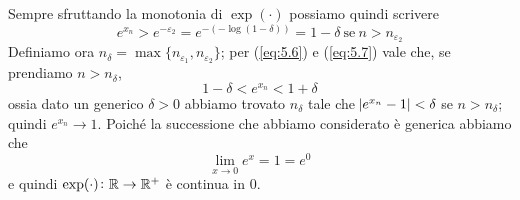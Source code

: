 \begin{example}
\[    \]
    Sempre sfruttando la monotonia di $\exp(\cdot)$ possiamo quindi scrivere
    \begin{equation}
        \label{eq:5.7}
        e^{x_n}>e^{-\varepsilon_2} = e^{-(-\log(1-\delta))} = 1-\delta \ \text{se} \ n>n_{\varepsilon_2}
    \end{equation}
    Definiamo ora $n_\delta = \max\{n_{\varepsilon_1}, n_{\varepsilon_2}\}$; per (\ref{eq:5.6}) e (\ref{eq:5.7}) vale che, se prendiamo $n>n_\delta$,
    \[
    1-\delta < e^{x_n} < 1+\delta
    \]
    ossia dato un generico $\delta>0$ abbiamo trovato $n_\delta$ tale che $\abs{e^{x_n}-1}<\delta$ se $n>n_\delta$; quindi $e^{x_n}\to 1$. Poiché la successione che abbiamo considerato è generica abbiamo che
    \[
    \lim_{x\to 0} e^x = 1 = e^0
    \]
    e quindi $\exp(\cdot)\colon \amsbb{R}\to \amsbb{R}^+$ è continua in 0.
\end{example}
